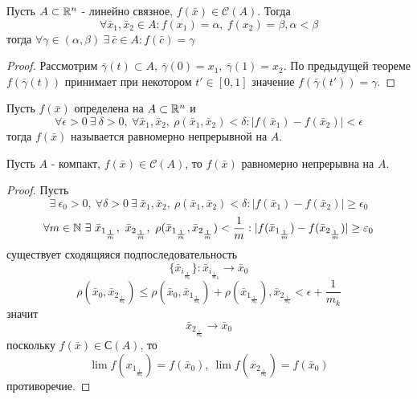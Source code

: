 \begin{theorem}
    Пусть $A\subset \mathbb{R}^n$ - линейно связное, $f(\bar{x})\in \mathcal{C}(A)$. Тогда
    \[\forall \bar{x}_1, \bar{x}_2\in A: f(x_1)=\alpha,\ f(x_2)=\beta, \alpha<\beta\]
    тогда $\forall \gamma\in (\alpha, \beta)\ \exists\ \bar{c}\in A: f(\bar{c})=\gamma$
\end{theorem} 
\begin{proof}
    Рассмотрим $\bar{\gamma}(t)\subset A,\ \bar{\gamma}(0)=x_1,\ \bar{\gamma}(1)=x_2$. По предыдущей теореме $f(\bar{\gamma}(t))$ принимает при некотором $t'\in [0,1]$ значение $f(\bar{\gamma}(t'))=\gamma$.
\end{proof} 
\begin{definition}
    Пусть $f(\bar{x})$ определена на $A\subset \mathbb{R}^n$ и
    \[\forall \epsilon>0\ \exists\ \delta>0,\ \forall \bar{x}_1, \bar{x}_2,\ \rho(\bar{x}_1, \bar{x}_2)<\delta: |f(\bar{x}_1)-f(\bar{x}_2)|<\epsilon\] 
    тогда $f(\bar{x})$ называется равномерно непрерывной на $A$.
\end{definition} 
\begin{theorem}
    Пусть $A$ - компакт, $f(\bar{x})\in \mathcal{C}(A)$, то $f(\bar{x})$ равномерно непрерывна на $A$.
\end{theorem} 
\begin{proof}
    Пусть 
    \[\exists\ \epsilon_0>0,\ \forall \delta>0\ \exists\ \bar{x}_{1}, \bar{x}_2,\ \rho(\bar{x}_1, \bar{x}_2)<\delta: |f(\bar{x}_1)-f(\bar{x}_2)|\geq \epsilon_0\]
    \[\forall m\in \N\ \exists\ \bar{x}_{1_{\frac{1}{m}}},\ \bar{x}_{2_{\frac{1}{m}}},\ \rho(\bar{x}_{1_{\frac{1}{m}}}, \bar{x}_{2_{\frac{1}{m}}})<\frac{1}{m}: |f(\bar{x}_{1_{\frac{1}{m}}})-f(\bar{x}_{2_{\frac{1}{m}}})|\geq \epsilon_0\]
    существует сходящяяся подпоследовательность
    \[\{\bar{x}_{i_{\frac{1}{m_k}}}\}: \bar{x}_{i_{\frac{1}{m}_k}}\to \bar{x}_0\]
    \[\rho(\bar{x}_0, \bar{x}_{2_{\frac{1}{m_k}}})\leq \rho(\bar{x}_0, \bar{x}_{1_{\frac{1}{m_k}}})+\rho(\bar{x}_{1_{\frac{1}{m_k}}}), \bar{x}_{2_{\frac{1}{m_k}}}<\epsilon+\frac{1}{m_k}\]
    значит 
    \[\bar{x}_{2_{\frac{1}{m_k}}}\to \bar{x}_0\]
    поскольку $f(\bar{x})\in \mathcal{С}(A)$, то
    \[\lim\limits f(x_{1_{\frac{1}{m_k}}})=f(\bar{x}_0),\ \lim\limits f(x_{2_{\frac{1}{m_k}}})=f(\bar{x}_0)\]
    противоречие.
\end{proof} 

